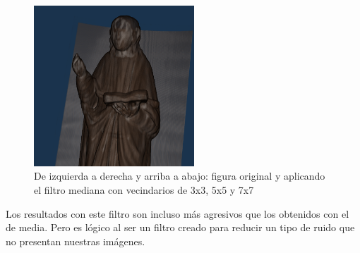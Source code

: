 \begin{figure}[H]
	\includegraphics[width=6cm]{imagenes/resultados/filtrado/mediana-7}
	\caption{De izquierda a derecha y arriba a abajo: figura original y aplicando el filtro mediana con vecindarios de 3x3, 5x5 y 7x7}
	\label{fig:resultados/filtrado/mediana}
\end{figure}

Los resultados con este filtro son incluso más agresivos que los obtenidos con el de media. Pero es lógico al ser un filtro creado para reducir un tipo de ruido que no presentan nuestras imágenes.
